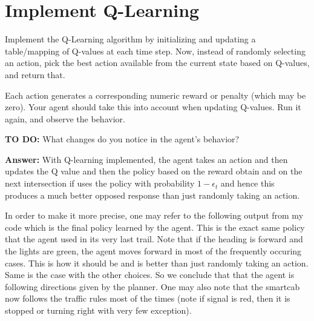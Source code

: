 \documentclass{article}
\begin{document}
\section{Implement Q-Learning}

Implement the Q-Learning algorithm by initializing and updating a table/mapping of Q-values at each time step. Now, instead of randomly selecting an action, pick the best action available from the current state based on Q-values, and return that.

Each action generates a corresponding numeric reward or penalty (which may be zero). Your agent should take this into account when updating Q-values. Run it again, and observe the behavior.

\vspace{.5cm}

\noindent\textbf{TO DO:} What changes do you notice in the agent’s behavior?

\vspace{.2cm}

\noindent\textbf{Answer:} With Q-learning implemented, the agent takes an action and then updates the Q value and then the policy based on the reward obtain and on the next intersection if uses the policy with probability $1-\epsilon_t$ and hence this produces a much better opposed response than just randomly taking an action.

In order to make it more precise, one may refer to the following output from my code which is the final policy learned by the agent. This is the exact same policy that the agent used in its very last trail. Note that if the heading is forward and the lights are green, the agent moves forward in most of the frequently occuring cases. This is how it should be and is better than just randomly taking an action. Same is the case with the other choices. So we conclude that that the agent is following directions given by the planner. One may also note that the smartcab now follows the traffic rules most of the times (note if signal is red, then it is stopped or turning right with very few exception). 
\end{document}
